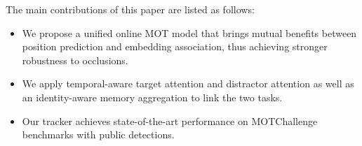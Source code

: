 \documentclass[final]{cvpr}
\begin{document}


The main contributions of this paper are listed as follows:
\begin{itemize}
    \item We propose a unified online MOT model that brings mutual benefits between position prediction and embedding association, thus achieving stronger robustness to occlusions.
    \item We apply temporal-aware target attention and distractor attention as well as an identity-aware memory aggregation to link the two tasks.
    \item Our tracker achieves state-of-the-art performance on MOTChallenge benchmarks with public detections.\
\end{itemize}
\end{document}
